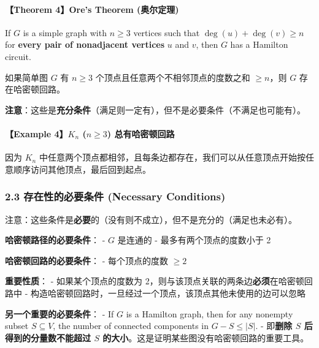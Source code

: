 \documentclass[10pt,a4paper,openany]{ctexbook}
\theoremstyle{definition}
\theoremstyle{remark}
\renewenvironment{quote}
  {\list{}{\leftmargin=1em\rightmargin=0pt\topsep=0.5pt\partopsep=0pt}\item[]}
  {\endlist}
\begin{document}
\paragraph{【Theorem 4】Ore's Theorem (奥尔定理)}

\begin{quote}
If $G$ is a simple graph with $n \ge 3$ vertices such that $\deg(u) + \deg(v) \ge n$ for \textbf{every pair of nonadjacent vertices} $u$ and $v$, then $G$ has a Hamilton circuit.

如果简单图 $G$ 有 $n \ge 3$ 个顶点且任意两个不相邻顶点的度数之和 $\ge n$，则 $G$ 存在哈密顿回路。

\textbf{注意}：这些是\textbf{充分条件}（满足则一定有），但不是必要条件（不满足也可能有）。

\end{quote}

\paragraph{【Example 4】$K_n$ ($n \ge 3$) 总有哈密顿回路}

因为 $K_n$ 中任意两个顶点都相邻，且每条边都存在，我们可以从任意顶点开始按任意顺序访问其他顶点，最后回到起点。
\vspace{-2pt}

\subsubsection{2.3 存在性的必要条件 (Necessary Conditions)}

\begin{quote}
注意：这些条件是\textbf{必要}的（没有则不成立），但不是充分的（满足也未必有）。

\textbf{哈密顿路径的必要条件}：
- $G$ 是连通的
- 最多有两个顶点的度数小于 2

\textbf{哈密顿回路的必要条件}：
- 每个顶点的度数 $\ge 2$

\textbf{重要性质}：
- 如果某个顶点的度数为 2，则与该顶点关联的两条边\textbf{必须}在哈密顿回路中
- 构造哈密顿回路时，一旦经过一个顶点，该顶点其他未使用的边可以忽略

\textbf{另一个重要的必要条件}：
- If $G$ is a Hamilton graph, then for any nonempty subset $S \subseteq V$, the number of connected components in $G - S \le |S|$.
- 即\textbf{删除 $S$ 后得到的分量数不能超过 $S$ 的大小}。这是证明某些图没有哈密顿回路的重要工具。

\end{quote}
\end{document}
